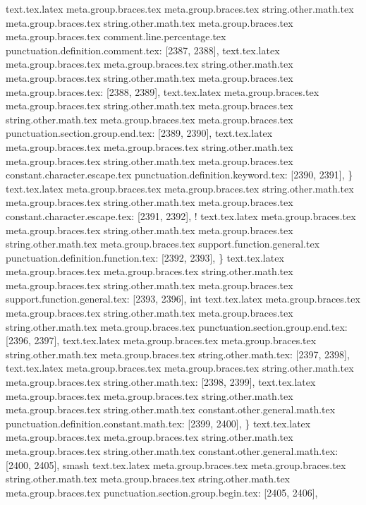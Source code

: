 {{{{{{{{{{{{{{{{{{{{{{{{{{{{{{{{{{{{{{{{{{{{{{{{{{{{{{{{{{{{{{{{{{{{{{{{{{{{{{{{{{{{{text.tex.latex meta.group.braces.tex meta.group.braces.tex string.other.math.tex meta.group.braces.tex string.other.math.tex meta.group.braces.tex meta.group.braces.tex comment.line.percentage.tex punctuation.definition.comment.tex: [2387, 2388], {%
text.tex.latex meta.group.braces.tex meta.group.braces.tex string.other.math.tex meta.group.braces.tex string.other.math.tex meta.group.braces.tex meta.group.braces.tex: [2388, 2389], {
}
text.tex.latex meta.group.braces.tex meta.group.braces.tex string.other.math.tex meta.group.braces.tex string.other.math.tex meta.group.braces.tex meta.group.braces.tex punctuation.section.group.end.tex: [2389, 2390], {}}
text.tex.latex meta.group.braces.tex meta.group.braces.tex string.other.math.tex meta.group.braces.tex string.other.math.tex meta.group.braces.tex constant.character.escape.tex punctuation.definition.keyword.tex: [2390, 2391], {\}
text.tex.latex meta.group.braces.tex meta.group.braces.tex string.other.math.tex meta.group.braces.tex string.other.math.tex meta.group.braces.tex constant.character.escape.tex: [2391, 2392], {!}
text.tex.latex meta.group.braces.tex meta.group.braces.tex string.other.math.tex meta.group.braces.tex string.other.math.tex meta.group.braces.tex support.function.general.tex punctuation.definition.function.tex: [2392, 2393], {\}
text.tex.latex meta.group.braces.tex meta.group.braces.tex string.other.math.tex meta.group.braces.tex string.other.math.tex meta.group.braces.tex support.function.general.tex: [2393, 2396], {int}
text.tex.latex meta.group.braces.tex meta.group.braces.tex string.other.math.tex meta.group.braces.tex string.other.math.tex meta.group.braces.tex punctuation.section.group.end.tex: [2396, 2397], {}}
text.tex.latex meta.group.braces.tex meta.group.braces.tex string.other.math.tex meta.group.braces.tex string.other.math.tex: [2397, 2398], {
}
text.tex.latex meta.group.braces.tex meta.group.braces.tex string.other.math.tex meta.group.braces.tex string.other.math.tex: [2398, 2399], {
}
text.tex.latex meta.group.braces.tex meta.group.braces.tex string.other.math.tex meta.group.braces.tex string.other.math.tex constant.other.general.math.tex punctuation.definition.constant.math.tex: [2399, 2400], {\}
text.tex.latex meta.group.braces.tex meta.group.braces.tex string.other.math.tex meta.group.braces.tex string.other.math.tex constant.other.general.math.tex: [2400, 2405], {smash}
text.tex.latex meta.group.braces.tex meta.group.braces.tex string.other.math.tex meta.group.braces.tex string.other.math.tex meta.group.braces.tex punctuation.section.group.begin.tex: [2405, 2406], {{}
}}}}}}}}}}}}}}}}}}}}}}}}}}}}}}}}}}}}}}}}}}}}}}}}}}}}}}}}}}}}}}}}}}}}}}}}}}}}}}}}}}}}}}}}
